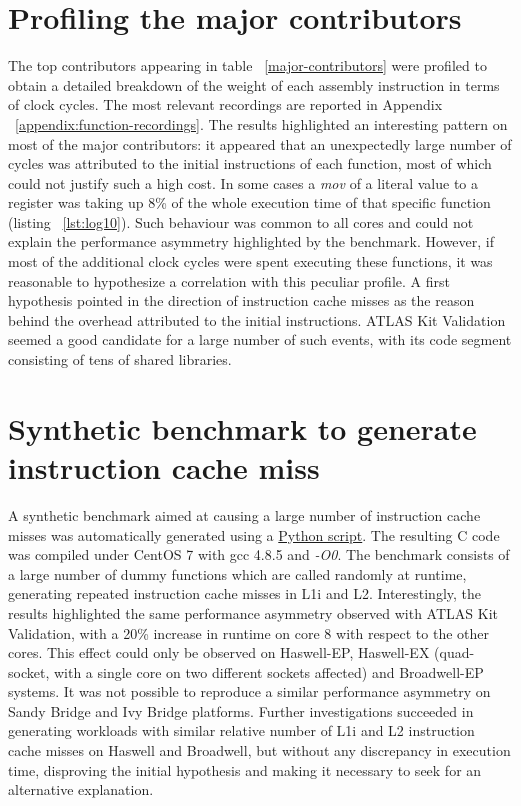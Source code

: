 \documentclass[a4paper]{jpconf}
\begin{document}
\section{Profiling the major contributors}
The top contributors appearing in table ~\ref{major-contributors} were profiled to obtain
a detailed breakdown of the weight of each assembly instruction in terms of 
clock cycles. The most relevant recordings are reported in Appendix  
~\ref{appendix:function-recordings}. The results highlighted an interesting 
pattern on most of the major contributors:  it appeared that an unexpectedly 
large number of cycles was attributed to the initial instructions of each function,
most of which could not justify such a high cost. In some cases a 
\textit{mov} of a literal value to a register was taking up 8\% of the whole 
execution time of that specific function (listing ~\ref{lst:log10}). 
Such behaviour was common to all cores and could not explain the performance
asymmetry highlighted by the benchmark. However, if most of the additional 
clock cycles were spent executing these functions, it was reasonable to hypothesize
a correlation with this peculiar profile. A first hypothesis
pointed in the direction of instruction cache misses as the reason behind
the overhead attributed to the initial instructions.
ATLAS Kit Validation seemed a good candidate for a large number of such events,
with its code segment consisting of tens of shared libraries. 

\section{Synthetic benchmark to generate instruction cache miss}
A synthetic benchmark aimed at causing a large number of instruction cache 
misses was automatically generated using a \href{https://gitlab.cern.ch/snippets/216}{Python script}. 
The resulting C code was compiled
under CentOS 7 with gcc 4.8.5 and \textit{-O0}. The benchmark consists of a large
number of dummy functions which are called randomly at runtime, generating
repeated instruction cache misses in L1i and L2. Interestingly, the results
highlighted the same performance asymmetry observed with ATLAS Kit Validation,
with a 20\% increase in runtime on core 8 with respect to the other cores.
This effect could only be observed on Haswell-EP, Haswell-EX (quad-socket, with 
a single core on two different sockets affected) and Broadwell-EP systems. It 
was not possible to reproduce a similar performance asymmetry on Sandy Bridge
and Ivy Bridge platforms.
Further investigations succeeded in generating
workloads with similar relative number of L1i and L2 instruction cache misses
on Haswell and Broadwell, but without any discrepancy in execution time, 
disproving the initial hypothesis and making it necessary to seek for an 
alternative explanation.
\end{document}
